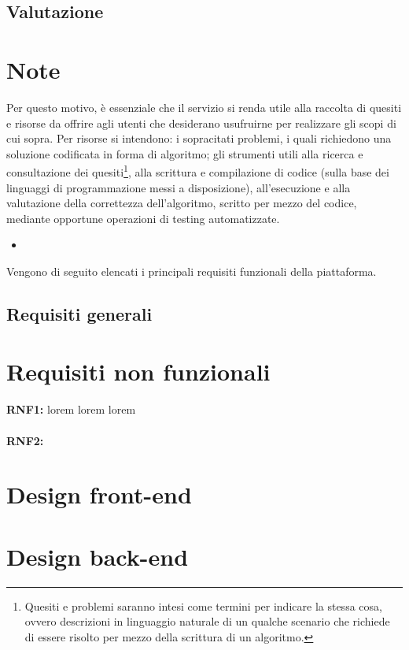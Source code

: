 \documentclass[11pt, a4paper]{article}
\theoremstyle{definition}
\begin{document}
\subsection*{Valutazione}


\newpage
\section*{Note}
Per questo motivo, è essenziale che il servizio si renda utile alla
raccolta di quesiti e risorse da offrire agli utenti che desiderano usufruirne
per realizzare gli scopi di cui sopra. Per risorse si intendono: i sopracitati
problemi, i quali richiedono una soluzione codificata in forma di algoritmo;
gli strumenti utili alla ricerca e consultazione dei
quesiti\footnote{Quesiti e problemi saranno intesi come termini per indicare la stessa cosa, ovvero descrizioni in linguaggio
naturale di un qualche scenario che richiede di essere risolto per mezzo
della scrittura di un algoritmo.}, alla scrittura e
compilazione di codice (sulla base dei linguaggi di programmazione
messi a disposizione), all'esecuzione e alla valutazione della
correttezza dell'algoritmo, scritto per mezzo del codice, mediante
opportune operazioni di testing automatizzate.

\begin{itemize}
    \item 
\end{itemize}


Vengono di seguito elencati i principali requisiti funzionali della
piattaforma.

\subsection{Requisiti generali}

\section{Requisiti non funzionali}
\textbf{RNF1: } lorem lorem lorem
\\\\
\textbf{RNF2: }

\section{Design front-end}

\section{Design back-end}
\end{document}
